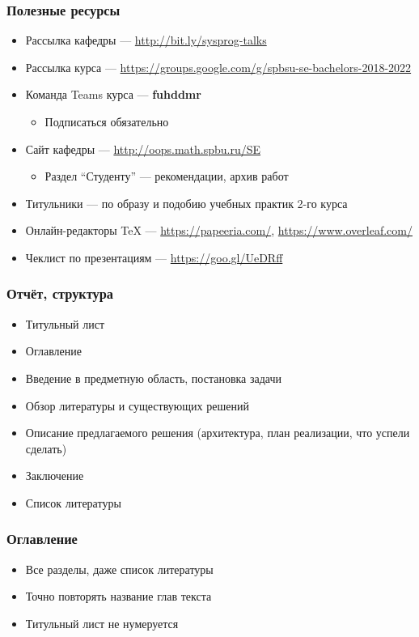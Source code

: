 \documentclass[xetex,mathserif,serif]{beamer}
\begin{document}
    \begin{frame}
        \frametitle{Полезные ресурсы}
        \begin{itemize}
            \item Рассылка кафедры --- \url{http://bit.ly/sysprog-talks}
            \item Рассылка курса --- \url{https://groups.google.com/g/spbsu-se-bachelors-2018-2022}
            \item Команда Teams курса --- \textbf{fuhddmr}
            \begin{itemize}
                \item Подписаться обязательно
            \end{itemize}
            \item Сайт кафедры --- \url{http://oops.math.spbu.ru/SE}
            \begin{itemize}
                \item Раздел ``Студенту'' --- рекомендации, архив работ
            \end{itemize}
            \item Титульники --- по образу и подобию учебных практик 2-го курса
            \item Онлайн-редакторы TeX --- \url{https://papeeria.com/}, \url{https://www.overleaf.com/}
            \item Чеклист по презентациям --- \url{https://goo.gl/UeDRff}
        \end{itemize}
    \end{frame}

    \begin{frame}
        \frametitle{Отчёт, структура}
        \begin{itemize}
            \item Титульный лист
            \item Оглавление
            \item Введение в предметную область, постановка задачи
            \item Обзор литературы и существующих решений
            \item Описание предлагаемого решения (архитектура, план реализации, что успели сделать)
            \item Заключение
            \item Список литературы
        \end{itemize}
    \end{frame}

    \begin{frame}
        \frametitle{Оглавление}
        \begin{itemize}
            \item Все разделы, даже список литературы
            \item Точно повторять название глав текста
            \item Титульный лист не нумеруется
        \end{itemize}
    \end{frame}
\end{document}
